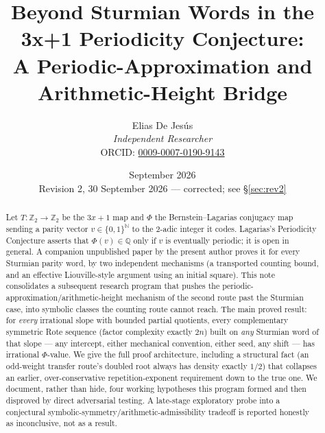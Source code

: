 \documentclass[11pt]{article}
\title{Beyond Sturmian Words in the 3x+1 Periodicity Conjecture:\\
A Periodic-Approximation and Arithmetic-Height Bridge}
\author{Elias De Jesús\\
\textit{Independent Researcher}\\
ORCID: \href{https://orcid.org/0009-0007-0190-9143}{0009-0007-0190-9143}}
\date{September 2026 \\[2pt] \textnormal{\small Revision 2, 30 September 2026 --- corrected; see \S\ref{sec:rev2}}}
\newcommand{\Q}{\mathbb{Q}}
\newcommand{\Z}{\mathbb{Z}}
\newcommand{\N}{\mathbb{N}}
\begin{document}
\sloppy
\maketitle

\begin{abstract}
Let $T:\Z_2\to\Z_2$ be the $3x+1$ map and $\Phi$ the Bernstein--Lagarias conjugacy map sending a parity vector $v\in\{0,1\}^\N$ to the 2-adic integer it codes. Lagarias's Periodicity Conjecture asserts that $\Phi(v)\in\Q$ only if $v$ is eventually periodic; it is open in general. A companion unpublished paper by the present author proves it for every Sturmian parity word, by two independent mechanisms (a transported counting bound, and an effective Liouville-style argument using an initial square). This note consolidates a subsequent research program that pushes the periodic-approximation/arithmetic-height mechanism of the second route past the Sturmian case, into symbolic classes the counting route cannot reach. The main proved result: for \emph{every} irrational slope with bounded partial quotients, every complementary symmetric Rote sequence (factor complexity exactly $2n$) built on \emph{any} Sturmian word of that slope --- any intercept, either mechanical convention, either seed, any shift --- has irrational $\Phi$-value. We give the full proof architecture, including a structural fact (an odd-weight transfer route's doubled root always has density exactly $1/2$) that collapses an earlier, over-conservative repetition-exponent requirement down to the true one. We document, rather than hide, four working hypotheses this program formed and then disproved by direct adversarial testing. A late-stage exploratory probe into a conjectural symbolic-symmetry/arithmetic-admissibility tradeoff is reported honestly as inconclusive, not as a result.


\end{abstract}
\end{document}
